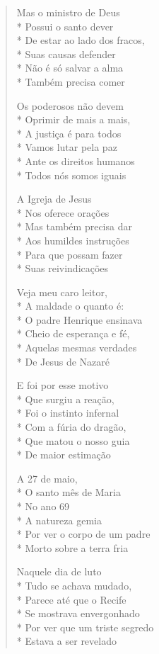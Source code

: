 \begin{verse}
Mas o ministro de Deus\\*
Possui o santo dever\\*
De estar ao lado dos fracos,\\*
Suas causas defender\\*
Não é só salvar a alma\\*
Também precisa comer

Os poderosos não devem\\*
Oprimir de mais a mais,\\*
A justiça é para todos\\*
Vamos lutar pela paz\\*
Ante os direitos humanos\\*
Todos nós somos iguais

A Igreja de Jesus\\*
Nos oferece orações\\*
Mas também precisa dar\\*
Aos humildes instruções \\*
Para que possam fazer\\*
Suas reivindicações

Veja meu caro leitor,\\*
A maldade o quanto é:\\*
O padre Henrique ensinava\\*
Cheio de esperança e fé,\\*
Aquelas mesmas verdades\\*
De Jesus de Nazaré

E foi por esse motivo\\*
Que surgiu a reação,\\*
Foi o instinto infernal\\*
Com a fúria do dragão,\\*
Que matou o nosso guia\\*
De maior estimação

A 27 de maio,\\*
O santo mês de Maria\\*
No ano 69\\*
A natureza gemia\\*
Por ver o corpo de um padre\\*
Morto sobre a terra fria

Naquele dia de luto\\*
Tudo se achava mudado,\\*
Parece até que o Recife\\*
Se mostrava envergonhado\\*
Por ver que um triste segredo\\*
Estava a ser revelado


\end{verse}
